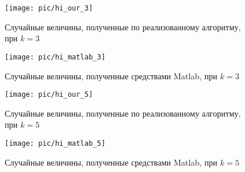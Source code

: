 \begin{figure}[h!]
  \begin{minipage}[h!]{0.47\linewidth}
    \texttt{[image: pic/hi\_our\_3]}
    \caption{Случайные величины, полученные по реализованному алгоритму,
      при $ k = 3 $
  }
  \end{minipage}
  \hfill
  \begin{minipage}[h!]{0.47\linewidth}
    \vspace{4mm}
    \texttt{[image: pic/hi\_matlab\_3]}
    \caption{Случайные величины, полученные средствами Matlab,
      при $ k = 3 $
    }
  \end{minipage}
\end{figure}

\begin{figure}[h!]
  \begin{minipage}[h!]{0.47\linewidth}
    \texttt{[image: pic/hi\_our\_5]}
    \caption{Случайные величины, полученные по реализованному алгоритму,
      при $ k = 5 $
  }
  \end{minipage}
  \hfill
  \begin{minipage}[h!]{0.47\linewidth}
    \vspace{4mm}
    \texttt{[image: pic/hi\_matlab\_5]}
    \caption{Случайные величины, полученные средствами Matlab,
      при $ k = 5 $
    }
    \label{pic:hi_end}
  \end{minipage}
\end{figure}

\newpage
